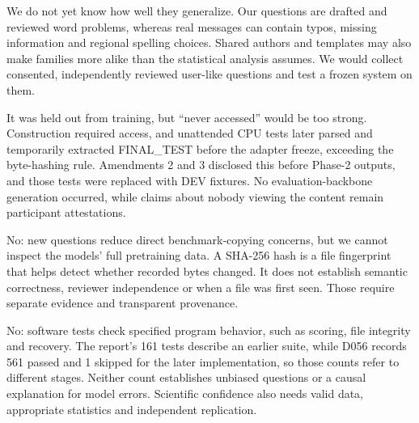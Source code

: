 \medskip{}\par\nopagebreak

We do not yet know how well they generalize. Our questions are drafted and reviewed word problems, whereas real messages can contain typos, missing information and regional spelling choices. Shared authors and templates may also make families more alike than the statistical analysis assumes. We would collect consented, independently reviewed user-like questions and test a frozen system on them.

\medskip{}\par\nopagebreak

It was held out from training, but “never accessed” would be too strong. Construction required access, and unattended CPU tests later parsed and temporarily extracted FINAL\_TEST before the adapter freeze, exceeding the byte-hashing rule. Amendments 2 and 3 disclosed this before Phase-2 outputs, and those tests were replaced with DEV fixtures. No evaluation-backbone generation occurred, while claims about nobody viewing the content remain participant attestations.

\medskip{}\par\nopagebreak

No: new questions reduce direct benchmark-copying concerns, but we cannot inspect the models' full pretraining data. A SHA-256 hash is a file fingerprint that helps detect whether recorded bytes changed. It does not establish semantic correctness, reviewer independence or when a file was first seen. Those require separate evidence and transparent provenance.

\medskip{}\par\nopagebreak

No: software tests check specified program behavior, such as scoring, file integrity and recovery. The report's 161 tests describe an earlier suite, while D056 records 561 passed and 1 skipped for the later implementation, so those counts refer to different stages. Neither count establishes unbiased questions or a causal explanation for model errors. Scientific confidence also needs valid data, appropriate statistics and independent replication.

